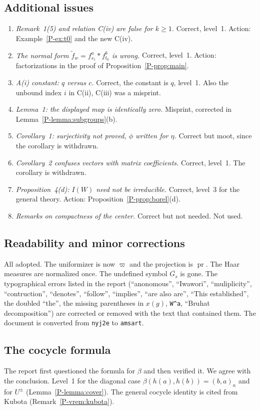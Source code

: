 \documentclass[12pt,letterpaper]{amsart}
\DeclareMathOperator{\pr}{pr}
\begin{document}
\subsection*{Additional issues}
\begin{enumerate}[leftmargin=1.5em,resume]
\item \emph{Remark~1(5) and relation C(iv) are false for $k\geq 1$.}
Correct, level~1. Action: Example~\ref{P-ex:t0} and the new C(iv).
\item \emph{The normal form $\tilde f_w=f_{s_1}^a*f_{t_0}^b$ is wrong.}
Correct, level~1. Action: factorizations in the proof of
Proposition~\ref{P-prop:main}.
\item \emph{A(i) constant: $q$ versus $c$.} Correct, the constant is
$q$, level~1. Also the unbound index $i$ in C(ii), C(iii) was a
misprint.
\item \emph{Lemma~1: the displayed map is identically zero.} Misprint,
corrected in Lemma~\ref{P-lemma:subgroups}(b).
\item \emph{Corollary~1: surjectivity not proved, $\phi$ written for
$\eta$.} Correct but moot, since the corollary is withdrawn.
\item \emph{Corollary~2 confuses vectors with matrix coefficients.}
Correct, level~1. The corollary is withdrawn.
\item \emph{Proposition~4(d): $I(W)$ need not be irreducible.} Correct,
level~3 for the general theory. Action:
Proposition~\ref{P-prop:borel}(d).
\item \emph{Remarks on compactness of the center.} Correct but not
needed. Not used.
\end{enumerate}

\subsection*{Readability and minor corrections}
All adopted. The uniformizer is now $\varpi$ and the projection is
$\pr$. The Haar measures are normalized once. The undefined symbol
$\overline{G_s}$ is gone. The typographical errors listed in the report
(``anonomous'', ``Iwawori'', ``muliplicity'', ``contruction'',
``denotes'', ``follow'', ``implies'', ``are also are'', ``This
established'', the doubled ``the'', the missing parentheses in $x(g)$,
\texttt{W\^{}a}, ``Bruhat decomposition'') are corrected or removed with
the text that contained them. The document is converted from
\texttt{nyj2e} to \texttt{amsart}.

\subsection*{The cocycle formula}
The report first questioned the formula for $\beta$ and then verified
it. We agree with the conclusion. Level~1 for the diagonal case
$\beta(h(a),h(b))=(b,a)_n$ and for $U^\pm$
(Lemma~\ref{P-lemma:cover}). The general cocycle identity is cited from
Kubota (Remark~\ref{P-vrem:kubota}).
\end{document}
